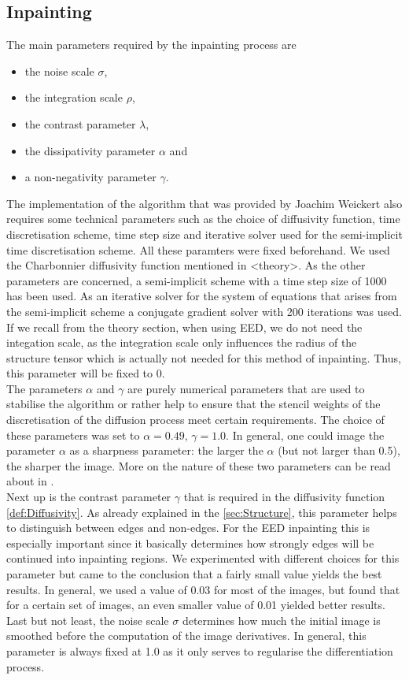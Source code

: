 \subsection{Inpainting}
The main parameters required by the inpainting process are 
\begin{itemize}
    \item the noise scale $\sigma$,
    \item the integration scale $\rho$,
    \item the contrast parameter $\lambda$, 
    \item the dissipativity parameter $\alpha$ and
    \item a non-negativity parameter $\gamma$.
\end{itemize}
The implementation of the algorithm that was provided by Joachim Weickert also requires some
technical parameters such as the choice of diffusivity function, time discretisation scheme, time
step size and iterative solver used for the semi-implicit time discretisation scheme.
 All these paramters were fixed beforehand. We used the Charbonnier diffusivity function mentioned
 in <theory>. As the other parameters are concerned, a semi-implicit scheme with a time step size
 of 1000 has been used. As an iterative solver for the system of equations that arises from the
 semi-implicit scheme a conjugate gradient solver with 200 iterations was used.
\\
If we recall from the theory section, when using EED, we do not need the integation scale, as the
integration scale only influences the radius of the structure tensor which is actually not needed
for this method of inpainting. Thus, this parameter will be fixed to 0.\\
The parameters $\alpha$ and $\gamma$ are purely numerical parameters that are used to 
stabilise the algorithm or rather help to ensure that the stencil weights of the discretisation of
the diffusion process meet certain requirements.
The choice of these parameters was set to $\alpha=0.49,\, \gamma=1.0$. In general, one could image the parameter $\alpha$ as a sharpness parameter: the larger the
$\alpha$ (but not larger than 0.5), the sharper the image. More on the nature of these two parameters can be read about in
\cite{www13, weickert96}.\\
Next up is the contrast parameter $\gamma$ that is required in the diffusivity function
\eqref{def:Diffusivity}. As already explained in the \ref{sec:Structure}, this parameter helps to
distinguish between edges and non-edges. For the EED inpainting this is especially important since
it basically determines how strongly edges will be continued into inpainting regions. We
experimented with different choices for this parameter but came to the conclusion that a fairly
small value yields the best results. In general, we used a value of 0.03 for most of the images,
but found that for a certain set of images, an even smaller value of 0.01 yielded better results.\\
Last but not least, the noise scale $\sigma$ determines how much the initial image is smoothed
before the computation of the image derivatives. In general, this parameter is always fixed at 1.0
as it only serves to regularise the differentiation process.
